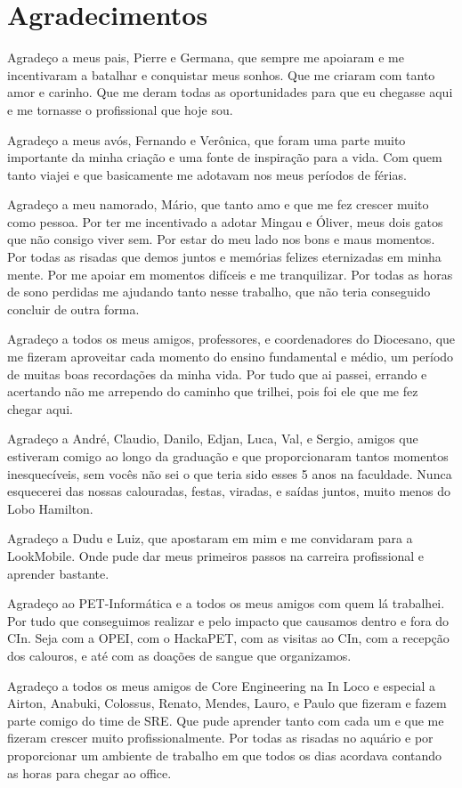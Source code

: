 \section*{Agradecimentos}

Agradeço a meus pais, Pierre e Germana, que sempre me apoiaram e me incentivaram a batalhar e conquistar meus sonhos. Que me criaram com tanto amor e carinho. Que me deram todas as oportunidades para que eu chegasse aqui e me tornasse o profissional que hoje sou.

Agradeço a meus avós, Fernando e Verônica, que foram uma parte muito importante da minha criação e uma fonte de inspiração para a vida. Com quem tanto viajei e que basicamente me adotavam nos meus períodos de férias.

Agradeço a meu namorado, Mário, que tanto amo e que me fez crescer muito como pessoa. Por ter me incentivado a adotar Mingau e Óliver, meus dois gatos que não consigo viver sem. Por estar do meu lado nos bons e maus momentos. Por todas as risadas que demos juntos e memórias felizes eternizadas em minha mente. Por me apoiar em momentos difíceis e me tranquilizar. Por todas as horas de sono perdidas me ajudando tanto nesse trabalho, que não teria conseguido concluir de outra forma.

Agradeço a todos os meus amigos, professores, e coordenadores do Diocesano, que me fizeram aproveitar cada momento do ensino fundamental e médio, um período de muitas boas recordações da minha vida. Por tudo que ai passei, errando e acertando não me arrependo do caminho que trilhei, pois foi ele que me fez chegar aqui.

Agradeço a André, Claudio, Danilo, Edjan, Luca, Val, e Sergio, amigos que estiveram comigo ao longo da graduação e que proporcionaram tantos momentos inesquecíveis, sem vocês não sei o que teria sido esses 5 anos na faculdade. Nunca esquecerei das nossas calouradas, festas, viradas, e saídas juntos, muito menos do Lobo Hamilton.

Agradeço a Dudu e Luiz, que apostaram em mim e me convidaram para a LookMobile. Onde pude dar meus primeiros passos na carreira profissional e aprender bastante.

Agradeço ao PET-Informática e a todos os meus amigos com quem lá trabalhei. Por tudo que conseguimos realizar e pelo impacto que causamos dentro e fora do CIn. Seja com a OPEI, com o HackaPET, com as visitas ao CIn, com a recepção dos calouros, e até com as doações de sangue que organizamos.

Agradeço a todos os meus amigos de Core Engineering na In Loco e especial a Airton, Anabuki, Colossus, Renato, Mendes, Lauro, e Paulo que fizeram e fazem parte comigo do time de SRE. Que pude aprender tanto com cada um e que me fizeram crescer muito profissionalmente. Por todas as risadas no aquário e por proporcionar um ambiente de trabalho em que todos os dias acordava contando as horas para chegar ao office. 
